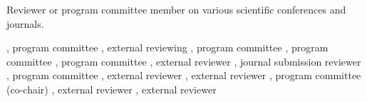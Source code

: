 \documentclass[9pt]{article}
\begin{document}



\medskip
{}

\noindent
Reviewer or program committee member on various scientific conferences and journals.

\noindent\newline{}, program committee 
\noindent\newline{}, external reviewing 
\noindent\newline{}, program committee 
\noindent\newline{}, program committee 
\noindent\newline{}, program committee 
\noindent\newline{},
external reviewer 
\noindent\newline{},
journal submission reviewer 
\newline{},
program committee 
\newline{},
external reviewer 
\newline{},
external reviewer 
\newline{},
program committee (co-chair)
\newline{},
external reviewer 
\newline{},
external reviewer 
\end{document}
